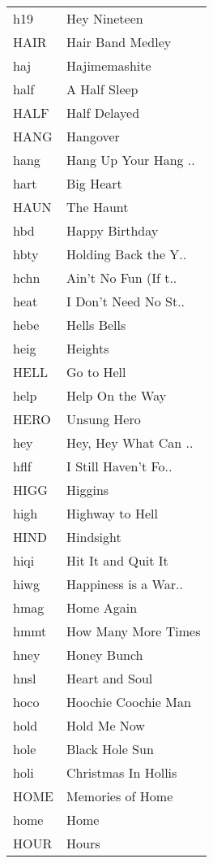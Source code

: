 \begin{supertabular}{ll}
  h19 &          Hey Nineteen \\
 HAIR &      Hair Band Medley \\
  haj &         Hajimemashite \\
 half &          A Half Sleep \\
 HALF &          Half Delayed \\
 HANG &              Hangover \\
 hang &  Hang Up Your Hang .. \\
 hart &             Big Heart \\
 HAUN &             The Haunt \\
  hbd &        Happy Birthday \\
 hbty &  Holding Back the Y.. \\
 hchn &  Ain't No Fun (If t.. \\
 heat &  I Don't Need No St.. \\
 hebe &           Hells Bells \\
 heig &               Heights \\
 HELL &            Go to Hell \\
 help &       Help On the Way \\
 HERO &           Unsung Hero \\
  hey &  Hey, Hey What Can .. \\
 hflf &  I Still Haven't Fo.. \\
 HIGG &               Higgins \\
 high &       Highway to Hell \\
 HIND &             Hindsight \\
 hiqi &    Hit It and Quit It \\
 hiwg &  Happiness is a War.. \\
 hmag &            Home Again \\
 hmmt &   How Many More Times \\
 hney &           Honey Bunch \\
 hnsl &        Heart and Soul \\
 hoco &   Hoochie Coochie Man \\
 hold &           Hold Me Now \\
 hole &        Black Hole Sun \\
 holi &   Christmas In Hollis \\
 HOME &      Memories of Home \\
 home &                  Home \\
 HOUR &                 Hours \\

\end{supertabular}
